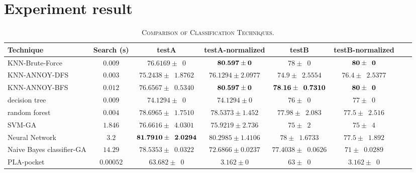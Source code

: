 \documentclass[twocolumn,10pt]{article}
\begin{document}
\section{Experiment result}
  \begin{table}[htb]
    \newcommand{\z}{\phantom{0}}
    \caption{\textsc{Comparison of Classification Techniques.}}
      \vspace{-\baselineskip}
    \begin{tabular}{@{}lccccccl@{}}\toprule
    Technique & Search (s)       & testA                              & testA-normalized             & testB                          & testB-normalized \\ \midrule
    KNN-Brute-Force  & $0.009$   & $76.6169 \pm \z{0}$                & $\bf{80.597 \pm 0}$          & $78 \pm \z{0}$                 & $\bf{80 \pm \z{0}}$\\
    KNN-ANNOY-DFS    & $0.003$   & $75.2438 \pm \z{1.8762}$           & $76.1294 \pm 2.0977$         & $74.9 \pm \z{2.5554}$          & $76.4 \pm \z{2.5377}$\\
    KNN-ANNOY-BFS    & $0.012$   & $76.6567 \pm \z{0.5340}$           & $\bf{80.597 \pm 0}$          & $\bf{78.16 \pm \z{0.7310}}$    & $\bf{80 \pm \z{0}}$\\
    decision tree    & $0.009$   & $74.1294 \pm \z{0}$                & $74.1294 \pm 0$              & $76 \pm \z{0}$                 & $77 \pm \z{0}$\\
    random forest    & $0.004$   & $78.6965 \pm \z{1.7510}$           & $78.5373 \pm 1.452$          & $77.98 \pm \z{2.083}$          & $77.5 \pm \z{2.516}$\\
    SVM-GA           & $1.846$   & $76.6616 \pm \z{4.0301}$           & $75.9219 \pm 2.736$          & $75 \pm \z{2}$                 & $75 \pm \z{4}$\\
    Neural Network   & $3.2$     & $\bf{81.7910 \pm \z{2.0294}}$      & $80.2985 \pm 1.4106$         & $78 \pm \z{1.6733}$            & $77.5 \pm \z{1.892}$\\
    Naive Bayes classifier-GA  & $14.29$ & $78.5353 \pm \z{0.0322}$   & $72.6866 \pm 0.0237$         & $77.4038 \pm \z{0.0626}$       & $71 \pm \z{0.0289}$\\
    PLA-pocket       & $0.00052$ & $63.682 \pm \z{0}$                 & $3.162 \pm 0$                & $63 \pm \z{0}$                 & $3.162 \pm \z{0}$\\ \midrule
    \end{tabular}
    \label{table:overall}
      \vspace{-\baselineskip}
  \end{table}
\end{document}
